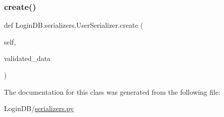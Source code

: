 \subsubsection{\texorpdfstring{create()}{create()}}
{\footnotesize\ttfamily def Login\+D\+B.\+serializers.\+User\+Serializer.\+create (\begin{DoxyParamCaption}\item[{}]{self,  }\item[{}]{validated\+\_\+data }\end{DoxyParamCaption})}



The documentation for this class was generated from the following file\+:\begin{DoxyCompactItemize}
\item 
Login\+D\+B/\hyperlink{serializers_8py}{serializers.\+py}\end{DoxyCompactItemize}
